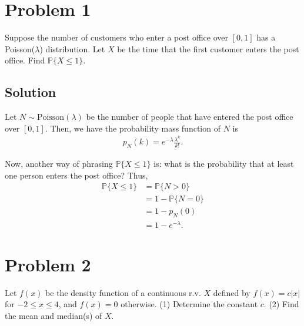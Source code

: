 \documentclass[10pt,a4paper]{article}
\author{Jeremiah Givens}
\theoremstyle{theorem}
\theoremstyle{definition}
\newcommand{\Prob}{\mathbb{P}}
\begin{document}
\section*{Problem 1}
Suppose the number of customers who enter a post office over $[0, 1]$ has a Poisson($\lambda$) distribution. Let $X$ be the time that the first customer enters the post office. Find $\Prob\{X \leq 1\}$.

\subsection*{Solution}
Let $N \sim \text{Poisson}(\lambda)$ be the number of people that have entered the post office over $[0, 1]$. Then,  we have the probability mass function of $N$ is
\begin{align*}
p_N(k) = e^{-\lambda} \frac{\lambda^k}{k!}.
\end{align*}

Now, another way of phrasing $\Prob\{X \leq 1 \}$ is: what is the probability that at least one person enters the post office? Thus,
\begin{align*}
\Prob\{X \leq 1 \} &= \Prob\{N > 0 \}\\
&= 1 - \Prob\{N = 0 \}\\
&= 1 - p_N(0)\\
&= 1 - e^{-\lambda}.
\end{align*}

\section*{Problem 2}
Let $f(x)$ be the density function of a continuous r.v.  $X$ defined by $f(x) = c |x|$ for $-2 \leq x \leq 4$, and $f(x) = 0$ otherwise. (1) Determine the constant $c$. (2) Find the mean and median(s) of $X$.
\end{document}
